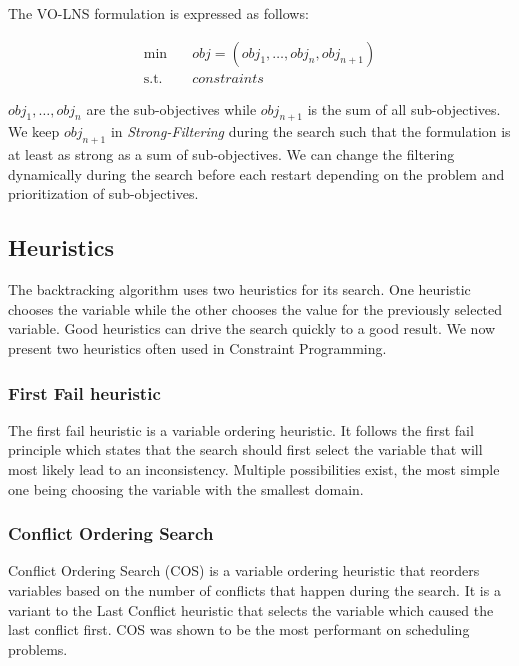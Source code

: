 \documentclass[../../thesis.tex]{subfiles}
\begin{document}
The VO-LNS formulation is expressed as follows:

\begin{align*}
  \text{min} \quad & obj = (obj_1, \dots, obj_n, obj_{n+1}) \\
  \text{s.t.} \quad & constraints 
\end{align*}

$obj_1, \dots, obj_n$ are the sub-objectives while $obj_{n+1}$ is the sum of all sub-objectives. We keep $obj_{n+1}$ in 
\emph{Strong-Filtering} during the search such that the formulation is at least as strong as a sum of sub-objectives.
We can change the filtering dynamically during the search before each restart depending on the problem and prioritization of sub-objectives.

\subsection{Heuristics}

The backtracking algorithm uses two heuristics for its search. One heuristic chooses the variable while the other chooses 
the value for the previously selected variable. Good heuristics can drive the search quickly to a good result. We now present two
heuristics often used in Constraint Programming.

\subsubsection{First Fail heuristic}

The first fail heuristic is a variable ordering heuristic. 
It follows the first fail principle which states that the search should first 
select the variable that will most likely lead to an inconsistency. Multiple 
possibilities exist, the most simple one being choosing the variable with the smallest domain.

\subsubsection{Conflict Ordering Search}

Conflict Ordering Search (COS) \cite{Gay:COS} is a variable ordering heuristic that 
reorders variables based on the number of conflicts that happen during the search.
It is a variant to the Last Conflict heuristic that selects the variable which caused the last conflict first.
COS was shown to be the most performant on scheduling problems.
\end{document}
